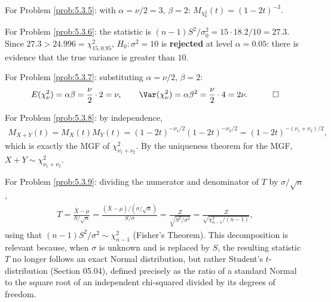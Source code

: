 \begin{solucion}
	\label{sol:5.3.5}
	For Problem \ref{prob:5.3.5}: with $\alpha=\nu/2=3$, $\beta=2$: $M_{\chi^2_6}(t) = (1-2t)^{-3}$. \quad \qedhere
\end{solucion}

\begin{solucion}
	\label{sol:5.3.6}
	For Problem \ref{prob:5.3.6}: the statistic is $(n-1)S^2/\sigma_0^2 = 15\cdot 18.2/10 = 27.3$. Since $27.3 > 24.996 = \chi^2_{15,0.95}$, $H_0:\sigma^2=10$ is \textbf{rejected} at level $\alpha=0.05$: there is evidence that the true variance is greater than $10$. \quad \qedhere
\end{solucion}

\begin{solucion}
	\label{sol:5.3.7}
	For Problem \ref{prob:5.3.7}: substituting $\alpha=\nu/2$, $\beta=2$:
	\begin{align*}
		E(\chi^2_\nu) = \alpha\beta = \frac{\nu}{2}\cdot 2 = \nu, \qquad
		\Var(\chi^2_\nu) = \alpha\beta^2 = \frac{\nu}{2}\cdot 4 = 2\nu. \quad \qedhere
	\end{align*}
\end{solucion}

\begin{solucion}
	\label{sol:5.3.8}
	For Problem \ref{prob:5.3.8}: by independence,
	\begin{align*}
		M_{X+Y}(t) = M_X(t)M_Y(t) = (1-2t)^{-\nu_1/2}(1-2t)^{-\nu_2/2} = (1-2t)^{-(\nu_1+\nu_2)/2},
	\end{align*}
	which is exactly the MGF of $\chi^2_{\nu_1+\nu_2}$. By the uniqueness theorem for the MGF, $X+Y\sim\chi^2_{\nu_1+\nu_2}$. \quad \qedhere
\end{solucion}

\begin{solucion}
	\label{sol:5.3.9}
	For Problem \ref{prob:5.3.9}: dividing the numerator and denominator of $T$ by $\sigma/\sqrt n$,
	\begin{align*}
		T = \frac{\bar X-\mu}{S/\sqrt n} = \frac{(\bar X-\mu)/(\sigma/\sqrt n)}{S/\sigma} = \frac{Z}{\sqrt{S^2/\sigma^2}} = \frac{Z}{\sqrt{\chi^2_{n-1}/(n-1)}},
	\end{align*}
	using that $(n-1)S^2/\sigma^2\sim\chi^2_{n-1}$ (Fisher's Theorem). This decomposition is relevant because, when $\sigma$ is unknown and is replaced by $S$, the resulting statistic $T$ no longer follows an exact Normal distribution, but rather Student's $t$-distribution (Section 05.04), defined precisely as the ratio of a standard Normal to the square root of an independent chi-squared divided by its degrees of freedom. \quad \qedhere
\end{solucion}

